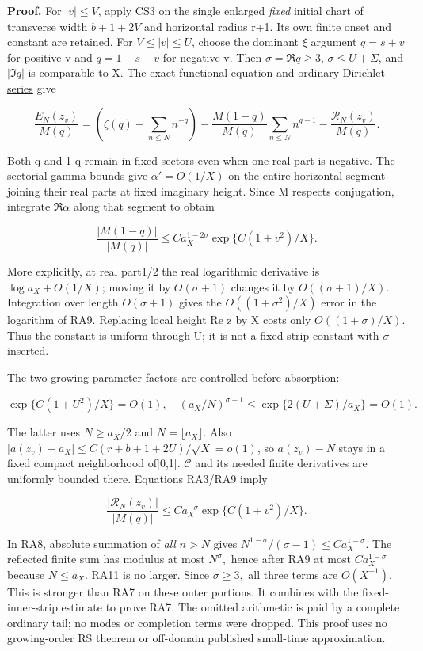 \textbf{Proof.} For \(|v|\le V\), apply CS3 on the single enlarged \emph{fixed} initial chart of transverse width \(b+1+2V\) and horizontal radius r+1. Its own finite onset and constant are retained. For \(V\le |v|\le U\), choose the dominant \(\xi\) argument \(q=s+v\) for positive v and \(q=1-s-v\) for negative v. Then \(\sigma=\Re q\ge 3\), \(\sigma\le U+\Sigma\), and \(|\Im q|\) is comparable to X. The exact functional equation and ordinary \href{https://dlmf.nist.gov/25.2.E1}{Dirichlet series} give

\[
\frac{E_N(z_v)}{M(q)}=
 \left(\zeta(q)-\sum_{n\le N}n^{-q}\right)
 -\frac{M(1-q)}{M(q)}\sum_{n\le N}n^{q-1}
 -\frac{\mathcal R_N(z_v)}{M(q)}.
\tag{RA8}\label{eq:ansatz-ra8}
\]

Both q and 1-q remain in fixed sectors even when one real part is negative. The \href{https://dlmf.nist.gov/5.11#ii}{sectorial gamma bounds} give \(\alpha'=O(1/X)\) on the entire horizontal segment joining their real parts at fixed imaginary height. Since M respects conjugation, integrate \(\Re \alpha\) along that segment to obtain

\[
\frac{|M(1-q)|}{|M(q)|}
 \le C a_X^{1-2\sigma}\exp\{C(1+v^2)/X\}.
\tag{RA9}\label{eq:ansatz-ra9}
\]

More explicitly, at real part1/2 the real logarithmic derivative is \(\log a_{X}+O(1/X)\); moving it by \(O(\sigma+1)\) changes it by \(O((\sigma+1)/X)\). Integration over length \(O(\sigma+1)\) gives the \(O((1+\sigma^{2})/X)\) error in the logarithm of RA9. Replacing local height Re z by X costs only \(O((1+\sigma)/X).\) Thus the constant is uniform through U; it is not a fixed-strip constant with \(\sigma\) inserted.

The two growing-parameter factors are controlled before absorption:

\[
\exp\{C(1+U^2)/X\}=O(1),\quad
(a_X/N)^{\sigma-1}\le\exp\{2(U+\Sigma)/a_X\}=O(1).
\tag{RA10}\label{eq:ansatz-ra10}
\]

The latter uses \(N\ge a_{X}/2\) and \(N=\lfloor a_{X}\rfloor.\) Also \(|a(z_{v})-a_{X}|\le C(r+b+1+2U)/\sqrt X=o(1)\), so \(a(z_{v})-N\) stays in a fixed compact neighborhood of[0,1]. $\mathcal C$ and its needed finite derivatives are uniformly bounded there. Equations RA3/RA9 imply

\[
\frac{|\mathcal R_N(z_v)|}{|M(q)|}
 \le C a_X^{-\sigma}\exp\{C(1+v^2)/X\}.
\tag{RA11}\label{eq:ansatz-ra11}
\]

In RA8, absolute summation of \emph{all} \(n>N\) gives \(N^{1-\sigma}/(\sigma-1)\le C a_{X}^{1-\sigma}\). The reflected finite sum has modulus at most \(N^{\sigma},\) hence after RA9 at most \(C a_{X}^{1-\sigma}\) because \(N\le a_X\). RA11 is no larger. Since \(\sigma\ge 3,\) all three terms are \(O(X^{-1}).\) This is stronger than RA7 on these outer portions. It combines with the fixed-inner-strip estimate to prove RA7. The omitted arithmetic is paid by a complete ordinary tail; no modes or completion terms were dropped. This proof uses no growing-order RS theorem or off-domain published small-time approximation.

